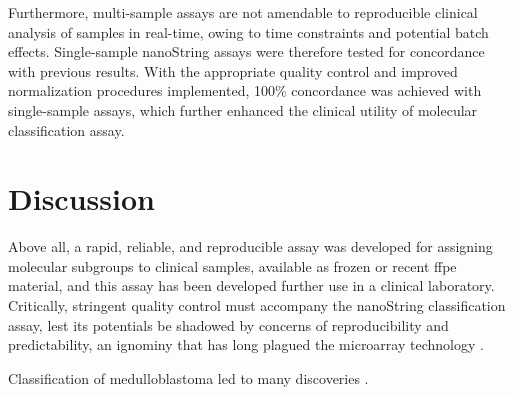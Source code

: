 Furthermore, multi-sample assays are not amendable to reproducible clinical analysis of samples in real-time, owing to time constraints and potential batch effects. Single-sample nanoString assays were therefore tested for concordance with previous results. With the appropriate quality control and improved normalization procedures implemented, 100\% concordance was achieved with single-sample assays, which further enhanced the clinical utility of molecular classification assay.

\section{Discussion}

Above all, a rapid, reliable, and reproducible assay was developed for assigning molecular subgroups to clinical samples, available as frozen or recent \gls{ffpe} material, and this assay has been developed further use in a clinical laboratory. Critically, stringent quality control must accompany the nanoString classification assay, lest its potentials be shadowed by concerns of reproducibility and predictability, an ignominy that has long plagued the microarray technology .

Classification of medulloblastoma led to many discoveries .

\clearpage

